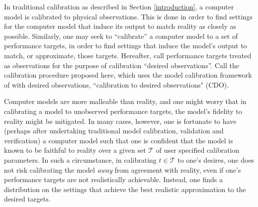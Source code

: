 \documentclass{article}
\begin{document}
%
In traditional calibration as described in Section \ref{introduction}, a computer model is calibrated to physical observations. 
%
This is done in order to find settings for the computer model that induce its output to match reality as closely as possible. 
%
Similarly, one may seek to ``calibrate'' a computer model to a set of performance targets, in order to find settings that induce the model's output to match, or approximate, those targets. 
%
Hereafter, call performance targets treated as observations for the purpose of calibration ``desired observations''. 
%
Call the calibration procedure proposed here, which uses the model calibration framework of \cite{Kennedy2001} with desired observations, ``calibration to desired observations" (CDO). 

Computer models are more malleable than reality, and one might worry that in calibrating a model to unobserved performance targets, the model's fidelity to reality might be mitigated.
%
%
In many cases, however, one is fortunate to have (perhaps after undertaking traditional model calibration, validation and verification) a computer model such that one is confident that the model is known to be faithful to reality over a given set $\mathcal T$ of user specified calibration parameters.
%
In such a circumstance, in calibrating $t\in\mathcal T$ to one's desires, one does not risk calibrating the model \emph{away} from agreement with reality, even if one's performance targets are not realistically achievable. 
%
Instead, one finds a distribution on the settings that achieve the best realistic approximation to the desired targets.
\end{document}

